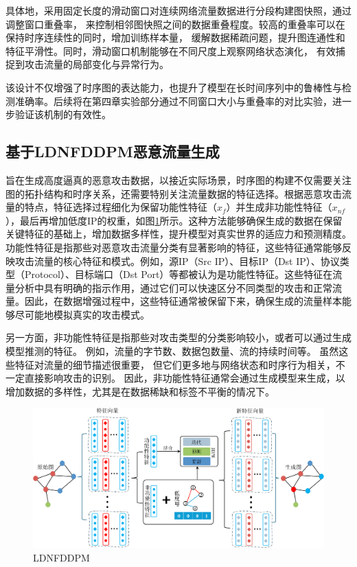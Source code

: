 \documentclass[promaster]{thesis-uestc}
\begin{document}
具体地，采用固定长度的滑动窗口对连续网络流量数据进行分段构建图快照，通过调整窗口重叠率，
来控制相邻图快照之间的数据重叠程度。较高的重叠率可以在保持时序连续性的同时，增加训练样本量，
缓解数据稀疏问题，提升图连通性和特征平滑性。同时，滑动窗口机制能够在不同尺度上观察网络状态演化，
有效捕捉到攻击流量的局部变化与异常行为。

该设计不仅增强了时序图的表达能力，也提升了模型在长时间序列中的鲁棒性与检测准确率。后续将在第四章实验部分通过不同窗口大小与重叠率的对比实验，进一步验证该机制的有效性。



\subsection{基于LDNFDDPM恶意流量生成}
旨在生成高度逼真的恶意攻击数据，以接近实际场景，时序图的构建不仅需要关注图的拓扑结构和时序关系，还需要特别关注流量数据的特征选择。根据恶意攻击流量的特点，特征选择过程细化为保留功能性特征（\( x_f \)）并生成非功能性特征（\( x_{nf} \)），最后再增加低度IP的权重，如图\ref{LDNFDDPM}所示。这种方法能够确保生成的数据在保留关键特征的基础上，增加数据多样性，提升模型对真实世界的适应力和预测精度。
功能性特征是指那些对恶意攻击流量分类有显著影响的特征，这些特征通常能够反映攻击流量的核心特征和模式。例如，源IP（Src IP）、目标IP（Dst IP）、协议类型（Protocol）、目标端口（Dst Port）等都被认为是功能性特征。这些特征在流量分析中具有明确的指示作用，通过它们可以快速区分不同类型的攻击和正常流量。因此，在数据增强过程中，这些特征通常被保留下来，确保生成的流量样本能够尽可能地模拟真实的攻击模式。

另一方面，非功能性特征是指那些对攻击类型的分类影响较小，或者可以通过生成模型推测的特征。
例如，流量的字节数、数据包数量、流的持续时间等。
虽然这些特征对流量的细节描述很重要，
但它们更多地与网络状态和时序行为相关，不一定直接影响攻击的识别。
因此，非功能性特征通常会通过生成模型来生成，以增加数据的多样性，尤其是在数据稀缺和标签不平衡的情况下。
\begin{figure}[h!]
    \centering
    \includegraphics[width=1\linewidth]{./pic/LDNFDDPM(大字版).pdf}
    \caption{LDNFDDPM}
    \label{LDNFDDPM}
\end{figure}
\end{document}
